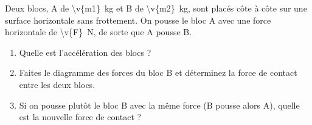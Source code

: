 Deux blocs, A de \qty{\v{m1}}{kg} et B de \qty{\v{m2}}{kg}, sont placés côte à côte sur une surface horizontale sans frottement. On pousse le bloc A avec une force horizontale de \qty{\v{F}}{N}, de sorte que A pousse B.

\begin{center}
\end{center}

\begin{enumerate}[label=\alph*)]
    \item Quelle est l'accélération des blocs ?
    \item Faites le diagramme des forces du bloc B et déterminez la force de contact entre les deux blocs.
    \item Si on pousse plutôt le bloc B avec la même force (B pousse alors A), quelle est la nouvelle force de contact ?
\end{enumerate}
